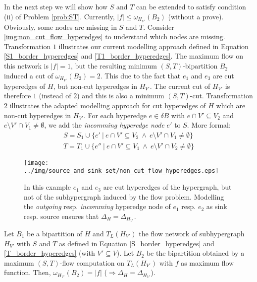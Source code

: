 In the next step we will show how $S$ and $T$ can be extended to satisfy condition (ii)
of Problem \autoref{prob:ST}. Currently, $|f| \le \omega_{H_{V'}}(B_2)$ (without a prove).
Obviously, some nodes are missing in $S$ and $T$. Consider \autoref{img:non_cut_flow_hyperedges}
to understand which nodes are missing. Transformation $1$ illustrates our current modelling
approach defined in Equation \ref{S1_border_hyperedges} and \ref{T1_border_hyperedges}. The maximum
flow on this network is $|f| = 1$, but the resulting minimum $(S,T)$-bipartition $B_2$ induced 
a cut of $\omega_{H_{V'}}(B_2) = 2$. This due to the fact that $e_1$ and $e_3$ are cut
hyperedges of $H$, but non-cut hyperedges in $H_{V'}$. The current cut of $H_{V'}$ is therefore
$1$ (instead of $2$) and this is also a minimum $(S,T)$-cut. Transformation $2$ illustrates the
adapted modelling approach for cut hyperedges of $H$ which are non-cut hyperedges in $H_{V'}$.
For each hyperedge $e \in \delta B$ with $e \cap V' \subseteq V_2$ and $e \setminus V' \cap V_1 \neq \emptyset$, 
we add the \emph{incomming hyperedge node} $e'$ to $S$.
More formal:
\begin{align}
S = S_1 \cup \{e'\ |\ e \cap V' \subseteq V_2 \ \land\ e \setminus V' \cap V_1  \neq \emptyset\} \label{S_border_hyperedges}\\
T = T_1 \cup \{e''\ |\ e \cap V' \subseteq V_1 \ \land\ e \setminus V' \cap V_2 \neq \emptyset \} \label{T_border_hyperedges}
\end{align}

\begin{figure}[ht!]
\centering
\texttt{[image: ../img/source\_and\_sink\_set/non\_cut\_flow\_hyperedges.eps]}
\caption{In this example $e_1$ and $e_3$ are cut hyperedges of the hypergraph, but not of
        the subhypergraph induced by the flow problem. Modelling the \emph{outgoing} resp.
        \emph{incomming} hyperedge node of $e_1$ resp. $e_2$ as sink resp. source ensures
        that $\Delta_H = \Delta_{H_{V'}}$.} 
\label{img:non_cut_flow_hyperedges}
\end{figure}

\begin{lemma}
\label{lemma:delta_proof}
Let $B_1$ be a bipartition of $H$ and $T_L(H_{V'})$ the flow network of subhypergraph
$H_{V'}$ with $S$ and $T$ as defined in Equation \ref{S_border_hyperedges} and \ref{T_border_hyperedges} (with $V' \subseteq V$).
Let $B_2$ be the bipartition obtained by a maximum $(S,T)$-flow computation on $T_L(H_{V'})$
with $f$ as maximum flow function.
Then, $\omega_{H_{V'}}(B_2) = |f|$ ($\Rightarrow \Delta_H = \Delta_{H_{V'}}$).
\end{lemma}
 

